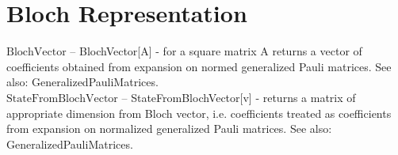 \documentclass[a4paper,10pt]{scrartcl}
\begin{document}
\section{Bloch Representation}

\noindent\textbf{$ \text{BlochVector} $ }-- BlochVector[A] - for a square matrix A returns a vector of coefficients obtained from expansion on normed generalized Pauli matrices. See also: GeneralizedPauliMatrices.$  $\\[8pt]
\noindent\textbf{$ \text{StateFromBlochVector} $ }-- StateFromBlochVector[v] - returns a matrix of appropriate dimension from Bloch vector, i.e. coefficients treated as coefficients from expansion on normalized generalized Pauli matrices. See also: GeneralizedPauliMatrices.$  $\\[8pt]
\end{document}
